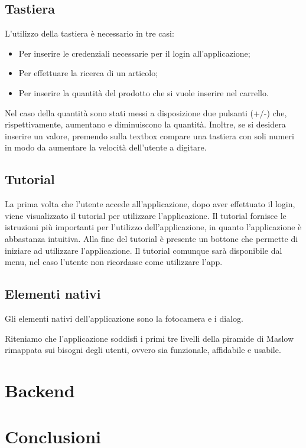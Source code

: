 \documentclass[12pt, a4paper, titlepage]{report}
\begin{document}
	\subsection{Tastiera}
	L'utilizzo della tastiera è necessario in tre casi:
	\begin{itemize}
		\item Per inserire le credenziali necessarie per il login all'applicazione;
		\item Per effettuare la ricerca di un articolo;
		\item Per inserire la quantità del prodotto che si vuole inserire nel carrello.
	\end{itemize}
	Nel caso della quantità sono stati messi a disposizione due pulsanti (+/-) che, rispettivamente, aumentano e diminuiscono la quantità. Inoltre, se si desidera inserire un valore, premendo sulla textbox compare una tastiera con soli numeri in modo da aumentare la velocità dell'utente a digitare.
	
	\subsection{Tutorial}
	La prima volta che l'utente accede all'applicazione, dopo aver effettuato il login, viene visualizzato il tutorial per utilizzare l'applicazione. Il tutorial fornisce le istruzioni più importanti per l'utilizzo dell'applicazione, in quanto l'applicazione è abbastanza intuitiva. Alla fine del tutorial è presente un bottone che permette di iniziare ad utilizzare l'applicazione. Il tutorial comunque sarà disponibile dal menu, nel caso l'utente non ricordasse come utilizzare l'app.
	
	\subsection{Elementi nativi}
	Gli elementi nativi dell'applicazione sono la fotocamera e i dialog.
	
	Riteniamo che l'applicazione soddisfi i primi tre livelli della piramide di Maslow rimappata sui bisogni degli utenti, ovvero sia funzionale, affidabile e usabile.
	
	\section{Backend}
	
	\section{Conclusioni}
\end{document}
